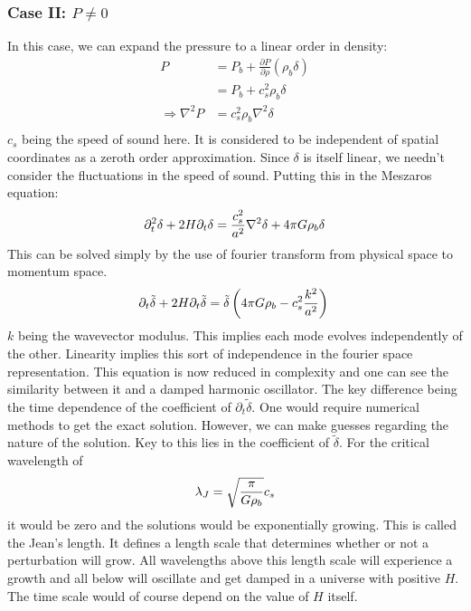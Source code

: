 \documentclass[12pt,a4paper,oneside]{book}
\def\pa{{\partial}}
\begin{document}
			\subsubsection{Case II: $P\neq0$}
				In this case, we can expand the pressure to a linear order in density:
				$$
				\begin{aligned}
					P&=P_b+\frac{\pa P}{\pa \rho}(\rho_b\delta)\\
					&=P_b+c_s^2\rho_b\delta\\
					\Rightarrow\nabla^2P&=c_s^2\rho_b\nabla^2\delta\\
				\end{aligned}
				$$
				$c_s$ being the speed of sound here. It is considered to be independent of spatial coordinates as a zeroth order approximation. Since $\delta$ is itself linear, we needn't consider the fluctuations in the speed of sound. Putting this in the Meszaros equation:
				$$
					\pa_t^2\delta+2H\pa_t\delta=\frac{c_s^2}{a^2}\nabla^2\delta+4\pi G\rho_b\delta\\
				$$
				This can be solved simply by the use of fourier transform from physical space to momentum space.
				$$
					\pa_t\tilde{\delta}+2H\pa_t\tilde{\delta}=\tilde{\delta}\left(4\pi G\rho_b-c_s^2\frac{k^2}{a^2}\right)\\
				$$
				$k$ being the wavevector modulus. This implies each mode evolves independently of the other. Linearity implies this sort of independence in the fourier space representation. This equation is now reduced in complexity and one can see the similarity between it and a damped harmonic oscillator. The key difference being the time dependence of the coefficient of $\pa_t\tilde{\delta}$. One would require numerical methods to get the exact solution. However, we can make guesses regarding the nature of the solution. Key to this lies in the coefficient of $\tilde{\delta}$. For the critical wavelength of
				\begin{equation}
					\lambda_J=\sqrt{\frac{\pi}{G\rho_b}}c_s\\
					\label{ew:JeansLength}
				\end{equation}
				it would be zero and the solutions would be exponentially growing. This is called the Jean's length. It defines a length scale that determines whether or not a perturbation will grow. All wavelengths above this length scale will experience a growth and all below will oscillate and get damped in a universe with positive $H$. The time scale would of course depend on the value of $H$ itself.
\end{document}
